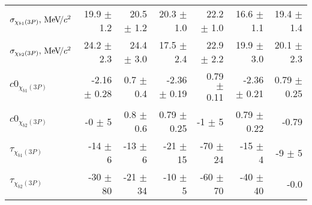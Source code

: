 \begin{table}[H]
{{\begin{tabular}{lrrrrrr}
\rule{0pt}{4ex}$\sigma_{\chi_{b1}(3P)}, {\mathrm{\,Me\kern -0.1em V\!/}c^2}$ & 19.9 $\pm$ 1.2 & 20.5 $\pm$ 1.2 & 20.3 $\pm$ 1.0 & 22.2 $\pm$ 1.0 & 16.6 $\pm$ 1.1 & 19.4 $\pm$ 1.4\\
$\sigma_{\chi_{b2}(3P)}, {\mathrm{\,Me\kern -0.1em V\!/}c^2}$ & 24.2 $\pm$ 2.3 & 24.4 $\pm$ 3.0 & 17.5 $\pm$ 2.4 & 22.9 $\pm$ 2.2 & 19.9 $\pm$ 3.0 & 20.1 $\pm$ 2.3\\

\rule{0pt}{4ex}$c0_{\chi_{b1}(3P)}$ & -2.16 $\pm$ 0.28 & 0.7 $\pm$ 0.4 & -2.36 $\pm$ 0.19 & 0.79 $\pm$ 0.11 & -2.36 $\pm$ 0.21 & 0.79 $\pm$ 0.25\\
$c0_{\chi_{b2}(3P)}$ & -0 $\pm$ 5 & 0.8 $\pm$ 0.6 & 0.79 $\pm$ 0.25 & -1 $\pm$ 5 & 0.79 $\pm$ 0.22 & -0.79\\

\rule{0pt}{4ex}$\tau_{\chi_{b1}(3P)}$ & -14 $\pm$ 6 & -13 $\pm$ 6 & -21 $\pm$ 15 & -70 $\pm$ 24 & -15 $\pm$ 4 & -9 $\pm$ 5\\
$\tau_{\chi_{b2}(3P)}$ & -30 $\pm$ 80 & -21 $\pm$ 34 & -10 $\pm$ 5 & -60 $\pm$ 70 & -40 $\pm$ 40 & -0.0\\
\bottomrule
\end{tabular}
} %

} %
\label{tab:mc:chib3p_ups2s:fits}
\end{table}

